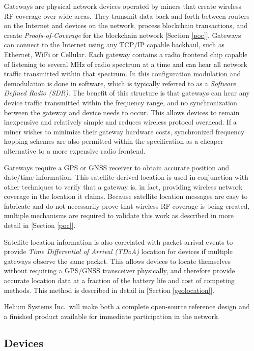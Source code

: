 \documentclass[10pt, nonatbib, nocopyrightspace, reprint]{sigplanconf}
\begin{document}
Gateways are physical network devices operated by miners that create wireless RF coverage over wide areas. They transmit data back and forth between routers on the Internet and devices on the network, process blockchain transactions, and create \emph{Proofs-of-Coverage} for the blockchain network [Section \ref{poc}]. Gateways can connect to the Internet using any TCP/IP capable backhaul, such as Ethernet, WiFi or Cellular. Each gateway contains a radio frontend chip capable of listening to several MHz of radio spectrum at a time and can hear all network traffic transmitted within that spectrum. In this configuration modulation and demodulation is done in software, which is typically referred to as a \emph{Software Defined Radio (SDR)}. The benefit of this structure is that gateways can hear any device traffic transmitted within the frequency range, and no synchronization between the gateway and device needs to occur. This allows devices to remain inexpensive and relatively simple and reduces wireless protocol overhead. If a miner wishes to minimize their gateway hardware costs, synchronized frequency hopping schemes are also permitted within the specification as a cheaper alternative to a more expensive radio frontend.

Gateways require a GPS or GNSS receiver to obtain accurate position and date/time information. This satellite-derived location is used in conjunction with other techniques to verify that a gateway is, in fact, providing wireless network coverage in the location it claims. Because satellite location messages are easy to fabricate and do not necessarily prove that wireless RF coverage is being created, multiple mechanisms are required to validate this work as described in more detail in [Section \ref{poc}].

Satellite location information is also correlated with packet arrival events to provide \emph{Time Differential of Arrival (TDoA)} location for devices if multiple gateways observe the same packet. This allows devices to locate themselves without requiring a GPS/GNSS transceiver physically, and therefore provide accurate location data at a fraction of the battery life and cost of competing methods. This method is described in detail in [Section \ref{geolocation}].

Helium Systems Inc.\ will make both a complete open-source reference design and a finished product available for immediate participation in the network.

\subsection{Devices}\label{devices}
\end{document}

